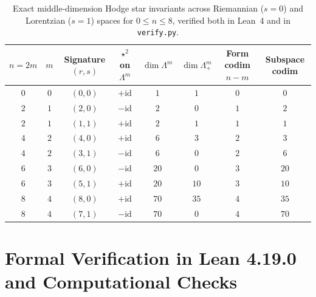 \documentclass[11pt]{article}
\theoremstyle{definition}
\newcommand{\id}{\mathrm{id}}
\begin{document}
\begin{table}[ht]
\centering
\small
\begin{tabular}{@{}cccccccc@{}}
\toprule
$n = 2m$ & $m$ & Signature $(r,s)$ & $\star^2$ on $\Lambda^m$ & $\dim\Lambda^m$ & $\dim\Lambda^m_+$ & Form codim $n-m$ & Subspace codim \\
\midrule
$0$ & $0$ & $(0,0)$ & $+\id$ & $1$ & $1$ & $0$ & $0$ \\
$2$ & $1$ & $(2,0)$ & $-\id$ & $2$ & $0$ & $1$ & $2$ \\
$2$ & $1$ & $(1,1)$ & $+\id$ & $2$ & $1$ & $1$ & $1$ \\
$4$ & $2$ & $(4,0)$ & $+\id$ & $6$ & $3$ & $2$ & $3$ \\
$4$ & $2$ & $(3,1)$ & $-\id$ & $6$ & $0$ & $2$ & $6$ \\
$6$ & $3$ & $(6,0)$ & $-\id$ & $20$ & $0$ & $3$ & $20$ \\
$6$ & $3$ & $(5,1)$ & $+\id$ & $20$ & $10$ & $3$ & $10$ \\
$8$ & $4$ & $(8,0)$ & $+\id$ & $70$ & $35$ & $4$ & $35$ \\
$8$ & $4$ & $(7,1)$ & $-\id$ & $70$ & $0$ & $4$ & $70$ \\
\bottomrule
\end{tabular}
\caption{Exact middle-dimension Hodge star invariants across Riemannian ($s=0$) and Lorentzian ($s=1$) spaces for $0 \le n \le 8$, verified both in Lean~4 and in \texttt{verify.py}.}
\label{tab:middle-dim}
\end{table}

\section{Formal Verification in Lean 4.19.0 and Computational Checks}
\end{document}
